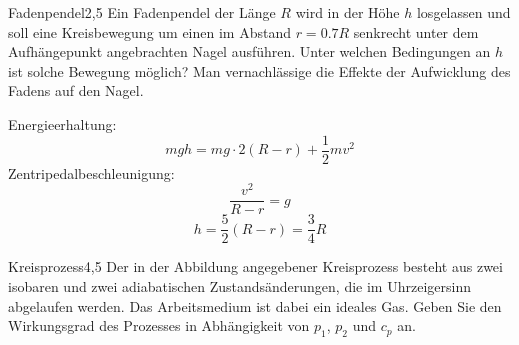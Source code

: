 

\begin{problem}{Fadenpendel}{2,5}
Ein Fadenpendel der Länge $R$ wird in der Höhe $h$ losgelassen und soll eine Kreisbewegung um einen im Abstand $r=0.7 R$ senkrecht unter dem Aufhängepunkt angebrachten Nagel ausführen. Unter welchen Bedingungen an $h$ ist solche Bewegung möglich? Man vernachlässige die Effekte der Aufwicklung des Fadens auf den Nagel.
\begin{solution}
Energieerhaltung:
\[
mgh = mg\cdot 2(R-r)+\frac12 mv^2
\]
Zentripedalbeschleunigung:
\[
\frac{v^2}{R-r} = g
\]
\[
h = \frac 5 2 (R-r) = \frac 3 4 R
\]
\end{solution}
\end{problem}

\begin{problem}{Kreisprozess}{4,5}
Der in der Abbildung angegebener Kreisprozess besteht aus zwei isobaren und zwei adiabatischen Zustandsänderungen, die im Uhrzeigersinn abgelaufen werden. Das Arbeitsmedium ist dabei ein ideales Gas. Geben Sie den Wirkungsgrad des Prozesses in Abhängigkeit von $p_1$, $p_2$ und $c_p$ an.
\end{problem}

